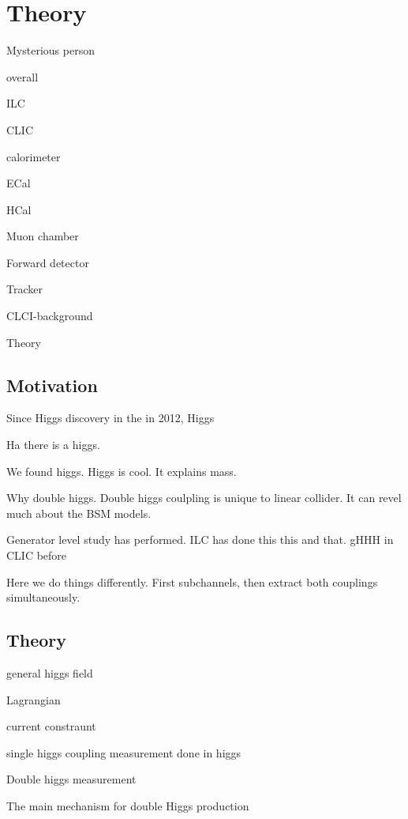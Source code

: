 \chapter{Theory}
\label{chap:Theory}

%
{Mysterious person}%

overall

ILC

CLIC

calorimeter

ECal

HCal

Muon chamber

Forward detector

Tracker

CLCI-background

Theory


\section{Motivation}

Since Higgs discovery in the \LHC in 2012, Higgs



Ha there is a higgs.

We found higgs. Higgs is cool. It explains mass.

Why double higgs. Double higgs coulpling is unique to linear collider. It can revel much about the BSM models.

Generator level study has performed. ILC has done this this and that. gHHH in CLIC before

Here we do things differently. First subchannels, then extract both couplings simultaneously.

\section{Theory}

general higgs field

Lagrangian

current constraunt

single higgs coupling measurement done in higgs

Double higgs measurement

The main mechanism for double Higgs production %
